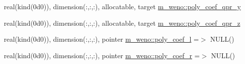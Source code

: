 \begin{Indent}
\begin{DoxyCompactItemize}
\item 
real(kind(0d0)), dimension(\+:,\+:,\+:), allocatable, target \hyperlink{namespacem__weno_a2e122ffcf340d423036ed315caae26cd}{m\+\_\+weno\+::poly\+\_\+coef\+\_\+qpr\+\_\+y}
\item 
real(kind(0d0)), dimension(\+:,\+:,\+:), allocatable, target \hyperlink{namespacem__weno_af8ee85fbadf8c00f10e2f57050bf38c6}{m\+\_\+weno\+::poly\+\_\+coef\+\_\+qpr\+\_\+z}
\item 
real(kind(0d0)), dimension(\+:,\+:,\+:), pointer \hyperlink{namespacem__weno_a139be4d526326088bbeb2fb41ccea127}{m\+\_\+weno\+::poly\+\_\+coef\+\_\+l} =$>$ N\+U\+LL()
\item 
real(kind(0d0)), dimension(\+:,\+:,\+:), pointer \hyperlink{namespacem__weno_a2e98c94233f9445dde8b9a86687e12c8}{m\+\_\+weno\+::poly\+\_\+coef\+\_\+r} =$>$ N\+U\+LL()
\end{DoxyCompactItemize}
\end{Indent}
